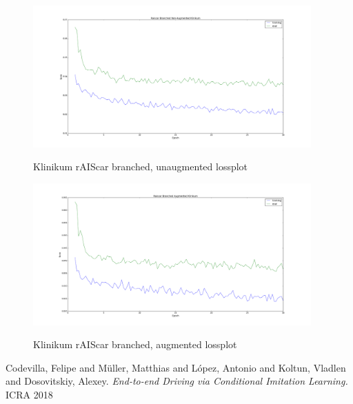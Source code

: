 \documentclass[a4paper]{article}
\begin{document}
\begin{figure}[H]
\centering
\includegraphics[width=0.95\textwidth]{figures/raiscar_branched_non_aug_klinikum_lossplot}
\label{fig:klinikum_unaugmented_branched_loss}
\caption{Klinikum rAIScar branched, unaugmented lossplot}
\end{figure}
\begin{figure}[H]
	\centering
	\includegraphics[width=0.95\textwidth]{figures/raiscar_branched_aug_klinikum_lossplot}
	\label{fig:klinikum_augmented_branched_loss}
	\caption{Klinikum rAIScar branched, augmented lossplot}
\end{figure}
\begin{thebibliography}{9}
Codevilla, Felipe and Müller, Matthias and López, Antonio and Koltun, Vladlen
and Dosovitskiy, Alexey.
\textit{End-to-end Driving via Conditional Imitation Learning.}
ICRA 2018
\end{thebibliography}
\end{document}
